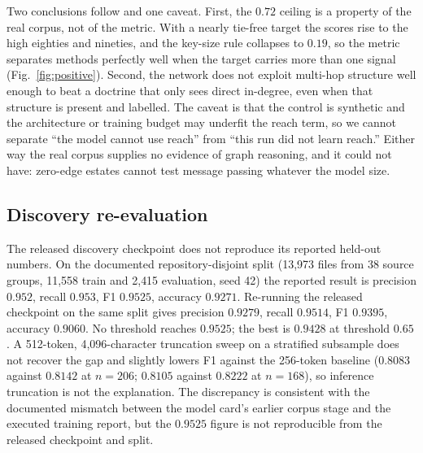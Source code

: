 \documentclass[journal,10pt]{IEEEtran}
\begin{document}
Two conclusions follow and one caveat. First, the $0.72$ ceiling is a property of the real corpus,
not of the metric. With a nearly tie-free target the scores rise to the high eighties and nineties,
and the key-size rule collapses to $0.19$, so the metric separates methods perfectly well when the
target carries more than one signal (Fig.~\ref{fig:positive}). Second, the network does not exploit
multi-hop structure well enough to beat a doctrine that only sees direct in-degree, even when that
structure is present and labelled. The caveat is that the control is synthetic and the architecture
or training budget may underfit the reach term, so we cannot separate ``the model cannot use reach''
from ``this run did not learn reach.'' Either way the real corpus supplies no evidence of graph
reasoning, and it could not have: zero-edge estates cannot test message passing whatever the model
size.

\subsection{Discovery re-evaluation}

The released discovery checkpoint does not reproduce its reported held-out numbers. On the
documented repository-disjoint split (13{,}973 files from 38 source groups, 11{,}558 train and
2{,}415 evaluation, seed 42) the reported result is precision $0.952$, recall $0.953$, F1 $0.9525$,
accuracy $0.9271$. Re-running the released checkpoint on the same split gives precision $0.9279$,
recall $0.9514$, F1 $0.9395$, accuracy $0.9060$. No threshold reaches $0.9525$; the best is $0.9428$
at threshold $0.65$. A 512-token, 4{,}096-character truncation sweep on a stratified subsample does
not recover the gap and slightly lowers F1 against the 256-token baseline ($0.8083$ against
$0.8142$ at $n=206$; $0.8105$ against $0.8222$ at $n=168$), so inference truncation is not the
explanation. The discrepancy is consistent with the documented mismatch between the model card's
earlier corpus stage and the executed training report, but the $0.9525$ figure is not reproducible
from the released checkpoint and split.
\end{document}
